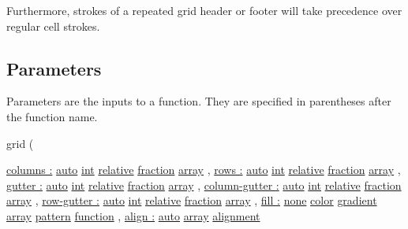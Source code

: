Furthermore, strokes of a repeated grid header or footer will take
precedence over regular cell strokes.

\subsection{\texorpdfstring{{ Parameters
}}{ Parameters }}\label{parameters}

\label{parameters-tooltip}
Parameters are the inputs to a function. They are specified in
parentheses after the function name.

{ grid } (

{ \hyperref[parameters-columns]{columns :}
\href{/docs/reference/foundations/auto/}{auto}
\href{/docs/reference/foundations/int/}{int}
\href{/docs/reference/layout/relative/}{relative}
\href{/docs/reference/layout/fraction/}{fraction}
\href{/docs/reference/foundations/array/}{array} , } {
\hyperref[parameters-rows]{rows :}
\href{/docs/reference/foundations/auto/}{auto}
\href{/docs/reference/foundations/int/}{int}
\href{/docs/reference/layout/relative/}{relative}
\href{/docs/reference/layout/fraction/}{fraction}
\href{/docs/reference/foundations/array/}{array} , } {
\hyperref[parameters-gutter]{gutter :}
\href{/docs/reference/foundations/auto/}{auto}
\href{/docs/reference/foundations/int/}{int}
\href{/docs/reference/layout/relative/}{relative}
\href{/docs/reference/layout/fraction/}{fraction}
\href{/docs/reference/foundations/array/}{array} , } {
\hyperref[parameters-column-gutter]{column-gutter :}
\href{/docs/reference/foundations/auto/}{auto}
\href{/docs/reference/foundations/int/}{int}
\href{/docs/reference/layout/relative/}{relative}
\href{/docs/reference/layout/fraction/}{fraction}
\href{/docs/reference/foundations/array/}{array} , } {
\hyperref[parameters-row-gutter]{row-gutter :}
\href{/docs/reference/foundations/auto/}{auto}
\href{/docs/reference/foundations/int/}{int}
\href{/docs/reference/layout/relative/}{relative}
\href{/docs/reference/layout/fraction/}{fraction}
\href{/docs/reference/foundations/array/}{array} , } {
\hyperref[parameters-fill]{fill :}
\href{/docs/reference/foundations/none/}{none}
\href{/docs/reference/visualize/color/}{color}
\href{/docs/reference/visualize/gradient/}{gradient}
\href{/docs/reference/foundations/array/}{array}
\href{/docs/reference/visualize/pattern/}{pattern}
\href{/docs/reference/foundations/function/}{function} , } {
\hyperref[parameters-align]{align :}
\href{/docs/reference/foundations/auto/}{auto}
\href{/docs/reference/foundations/array/}{array}
\href{/docs/reference/layout/alignment/}{alignment}
}
